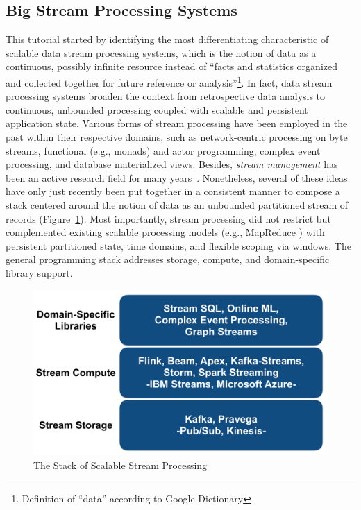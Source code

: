 
\subsection{Big Stream Processing Systems}
\label{sec:tut_systems}

This tutorial started by identifying the most differentiating characteristic of scalable data stream processing systems, which is the notion of data as a continuous, possibly infinite resource instead of ``facts and statistics organized and collected together for future reference or analysis''\footnote{Definition of ``data'' according to Google Dictionary}. In fact, data stream processing systems broaden the context from retrospective data analysis to continuous, unbounded processing coupled with scalable and persistent application state.  Various forms of stream processing have been employed in the past within their respective domains, such as network-centric processing on byte streams, functional (e.g., monads) and actor programming, complex event processing, and database materialized views. Besides, \emph{stream management} has been an active research field for many years~\cite{abadi2003aurora,arasu2004stream,chandrasekaran2003telegraphcq}. Nonetheless, several of these ideas have  only just recently been put together in a consistent manner to compose a stack  centered around the notion of data as an unbounded partitioned stream of records (Figure~\ref{fig:streamstack}). Most importantly, stream processing did not restrict but complemented existing scalable processing models (e.g., MapReduce \cite{dean2008mapreduce}) with persistent partitioned state, time domains, and flexible scoping via \mbox{windows}. The general programming stack  addresses storage, compute, and domain-specific library support.

\begin{figure}[t]
\centering
\includegraphics[width=0.4 \textwidth]{pictures/streamstack.pdf}
\caption{The Stack of Scalable Stream Processing}
\label{fig:streamstack}
\end{figure}

